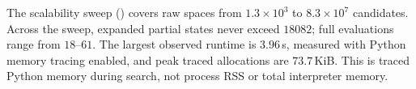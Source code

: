 %
The scalability sweep (\RefScalSite{}) covers raw spaces from $1.3\times10^3$ to $8.3\times10^7$ candidates. Across the sweep, expanded partial states never exceed $18082$; full evaluations range from $18\text{--}61$. The largest observed runtime is $3.96$\,s, measured with Python memory tracing enabled, and peak traced allocations are $73.7$\,KiB. This is traced Python memory during search, not process RSS or total interpreter memory.
